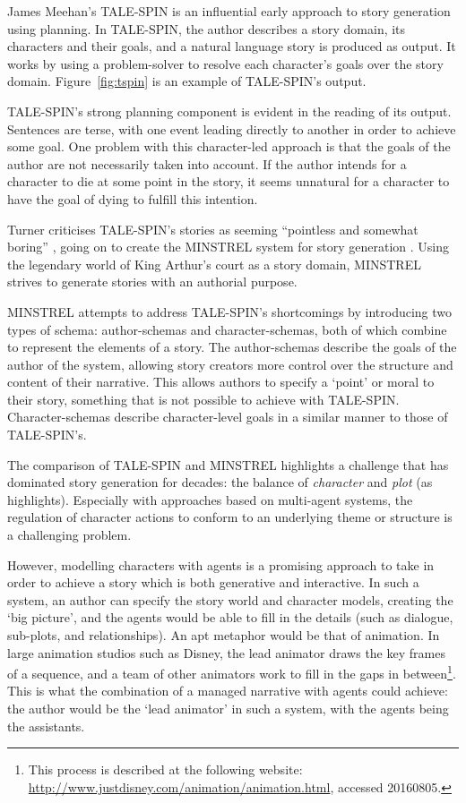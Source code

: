 \documentclass[11pt]{report}
\begin{document}
James Meehan's TALE-SPIN \citep{meehan1977tale} is an influential early approach to story generation using planning. In TALE-SPIN, the author describes a story domain, its characters and their goals, and a natural language story is produced as output. It works by using a problem-solver to resolve each character's goals over the story domain. Figure~\ref{fig:tspin} is an example of TALE-SPIN's output.

TALE-SPIN's strong planning component is evident in the reading of its output. Sentences are terse, with one event leading directly to another in order to achieve some goal. One problem with this character-led approach is that the goals of the author are not necessarily taken into account. If the author intends for a character to die at some point in the story, it seems unnatural for a character to have the goal of dying to fulfill this intention.

 Turner criticises TALE-SPIN's stories as seeming ``pointless and somewhat boring'' \citep{turner1986thematic}, going on to create the MINSTREL system for story generation \citep{turner1993minstrel}. Using the legendary world of King Arthur's court as a story domain, MINSTREL strives to generate stories with an authorial purpose.

MINSTREL attempts to address TALE-SPIN's shortcomings by introducing two types of schema: author-schemas and character-schemas, both of which combine to represent the elements of a story. The author-schemas describe the goals of the author of the system, allowing story creators more control over the structure and content of their narrative. This allows authors to specify a `point' or moral to their story, something that is not possible to achieve with TALE-SPIN. Character-schemas describe character-level goals in a similar manner to those of TALE-SPIN's.

The comparison of TALE-SPIN and MINSTREL highlights a challenge that has
dominated story generation for decades: the balance of \emph{character} and
\emph{plot} (as~\citet{riedl2010narrative} highlights). Especially with approaches based on multi-agent systems, the regulation of character actions to conform to an underlying theme or structure is a challenging problem.

However, modelling characters with agents is a promising approach to take in order to achieve a story which is both generative and interactive. In such a system, an author can specify the story world and character models, creating the `big picture', and the agents would be able to fill in the details (such as dialogue, sub-plots, and relationships).
An apt metaphor would be that of animation. In large animation studios such as
Disney, the lead animator draws the key frames of a sequence, and a team of
other animators work to fill in the gaps in
between\footnote{This process is described at the following website:
  \url{http://www.justdisney.com/animation/animation.html}, accessed 20160805.}. This is what the combination of a managed narrative with agents could achieve: the author would be the `lead animator' in such a system, with the agents being the assistants.
\end{document}

